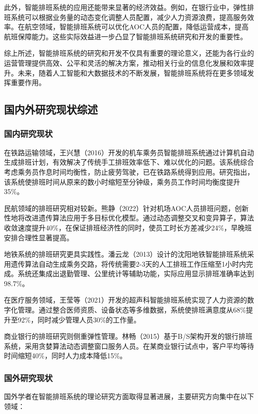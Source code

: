 \documentclass{ctexart}
\begin{document}
此外，智能排班系统的应用还能带来显著的经济效益。例如，在银行业中，弹性排班系统可以根据业务量的动态变化调整人员配置，减少人力资源浪费，提高服务效率\cite{1016015859.nh}。在航空领域，智能排班系统可以优化AOC人员的配置，降低运营成本，提高航班保障能力\cite{1022506340.nh}。这些实际效益进一步凸显了智能排班系统研究和开发的重要性。

综上所述，智能排班系统的研究和开发不仅具有重要的理论意义，还能为各行业的运营管理提供高效、公平和灵活的解决方案，推动相关行业的信息化发展和效率提升。未来，随着人工智能和大数据技术的不断发展，智能排班系统将在更多领域发挥重要作用。



\subsection{国内外研究现状综述}
\subsubsection{国内研究现状}
在铁路运输领域，王兴慧（2016）开发的机车乘务员智能排班系统通过计算机自动生成排班计划，有效解决了传统手工排班效率低下、难以优化的问题\cite{1016279053.nh}。该系统综合考虑乘务员作息时间均衡性，防止疲劳驾驶，已在铁路系统得到应用。研究指出，该系统使排班时间从原来的数小时缩短至分钟级，乘务员工作时间均衡度提升35\%。

民航领域的排班研究相对较新。熊静（2022）针对机场AOC人员排班问题，创新性地将改进遗传算法应用于多目标优化模型\cite{1022506340.nh}。通过动态调整交叉和变异算子，算法收敛速度提升40\%，在保证排班经济性的同时，使员工时长方差减少24\%，早晚班安排合理性显著提高。

地铁系统的排班研究更具实践性。潘云龙（2013）设计的沈阳地铁智能排班系统采用遗传算法自动生成乘务交路，将传统需要2-3天的人工排班工作压缩至1小时内完成\cite{1014151664.nh}。系统还集成出退勤管理、公里统计等辅助功能，实际应用显示排班准确率达到98.7\%。

在医疗服务领域，王莹等（2021）开发的超声科智能排班系统实现了人力资源的数字化管理\cite{XHYX202106028}。通过整合医师资质、设备状态等多维数据，系统使排班满意度从68\%提升至92\%，同时减少管理人员30\%的工作量。

商业银行的排班研究则侧重弹性管理。林畅（2015）基于B/S架构开发的银行排班系统，采用贪婪算法动态调整窗口服务人员\cite{1016015859.nh}。在某商业银行试点中，客户平均等待时间缩短40\%，同时人力成本降低15\%。

\subsubsection{国外研究现状}
国外学者在智能排班系统的理论研究方面取得显著进展，主要研究方向集中在以下领域：
\end{document}
